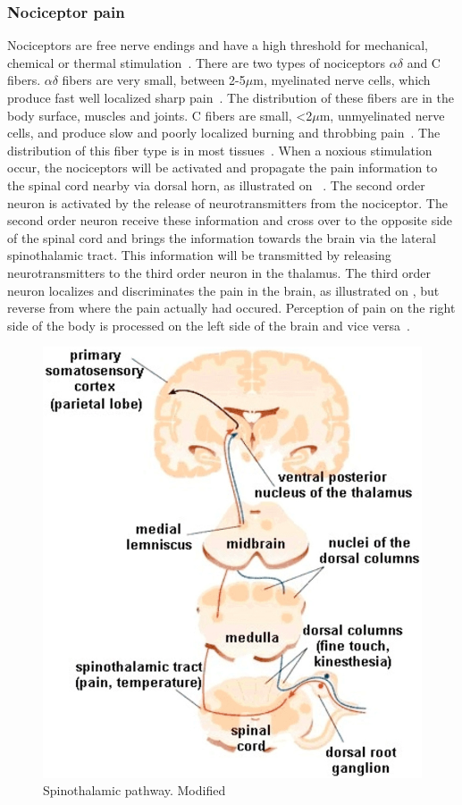 \subsubsection{Nociceptor pain}
Nociceptors are free nerve endings and have a high threshold for mechanical, chemical or thermal stimulation~\cite{Steeds2013}. There are two types of nociceptors $\alpha\delta$ and C fibers. $\alpha\delta$ fibers are very small, between 2-5$\mu$m, myelinated nerve cells, which produce fast well localized sharp pain~\cite{Steeds2013}. The distribution of these fibers are in the body surface, muscles and joints. C fibers are small, <2$\mu$m, unmyelinated nerve cells, and produce slow and poorly localized burning and throbbing pain~\cite{Steeds2013}. The distribution of this fiber type is in most tissues~\cite{Steeds2013}. 
When a noxious stimulation occur, the nociceptors will be activated and propagate the pain information to the spinal cord nearby via dorsal horn, as illustrated on ~\cite{Martini2012}.%
The second order neuron is activated by the release of neurotransmitters from the nociceptor. The second order neuron receive these information and cross over to the opposite side of the spinal cord and brings the information towards the brain via the lateral spinothalamic tract. This information will be transmitted by releasing neurotransmitters to the third order neuron in the thalamus. The third order neuron localizes and discriminates the pain in the brain, as illustrated on , but reverse from where the pain actually had occured. Perception of pain on the right side of the body is processed on the left side of the brain and vice versa~\cite{Martini2012}. 


\begin{figure}[H]
	\includegraphics[width=.5\textwidth]{figures/pathways.jpg} 
	\caption{Spinothalamic pathway. Modified~\cite{Martini2012}}
	\label{fig:pathways}  
\end{figure}   

